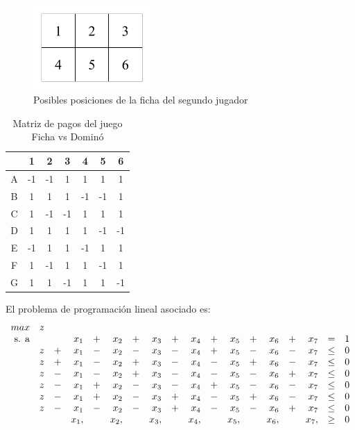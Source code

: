 \begin{figure}[hbt]
\caption{Posibles posiciones de la ficha del segundo jugador}
\label{fig:posiciones}
\centering
\includegraphics[width=0.4\textwidth]{figuras/posiciones.png}
\end{figure}

\begin{table}[hbt]
\begin{center}
\caption{Matriz de pagos del juego Ficha vs Dominó}
\label{table:pagos-domino}
\begin{tabular}{ c | c | c | c | c | c | c |}
  &  1 &  2 &  3 &  4 &  5 &  6 \\ \hline
A & -1 & -1 &  1 &  1 &  1 &  1 \\ \hline
B &  1 &  1 &  1 & -1 & -1 &  1 \\ \hline
C &  1 & -1 & -1 &  1 &  1 &  1 \\ \hline
D &  1 &  1 &  1 &  1 & -1 & -1 \\ \hline
E & -1 &  1 &  1 & -1 &  1 &  1 \\ \hline
F &  1 & -1 &  1 &  1 & -1 &  1 \\ \hline
G &  1 &  1 & -1 &  1 &  1 & -1 \\ \hline
\end{tabular}
\end{center}
\end{table}

El problema de programación lineal asociado es:
\begin{equation}
\begin{array}{r r r r r r r r r r r r r r r r r r}
max        &z& &   & &   & &   & &   & &   & &   & &   &      & \\
\text{s. a}
	& & &x_1&+&x_2&+&x_3&+&x_4&+&x_5&+&x_6&+&x_7& =    &1 \\
    &z&+&x_1&-&x_2&-&x_3&-&x_4&+&x_5&-&x_6&-&x_7& \leq &0 \\
    &z&+&x_1&-&x_2&+&x_3&-&x_4&-&x_5&+&x_6&-&x_7& \leq &0 \\
    &z&-&x_1&-&x_2&+&x_3&-&x_4&-&x_5&-&x_6&+&x_7& \leq &0 \\
    &z&-&x_1&+&x_2&-&x_3&-&x_4&+&x_5&-&x_6&-&x_7& \leq &0 \\
    &z&-&x_1&+&x_2&-&x_3&+&x_4&-&x_5&+&x_6&-&x_7& \leq &0 \\
    &z&-&x_1&-&x_2&-&x_3&+&x_4&-&x_5&-&x_6&+&x_7& \leq &0 \\
    & & &x_1,&&x_2,&&x_3,&&x_4,&&x_5,&&x_6,&&x_7,&\geq &0 \\
\end{array}
\end{equation}

